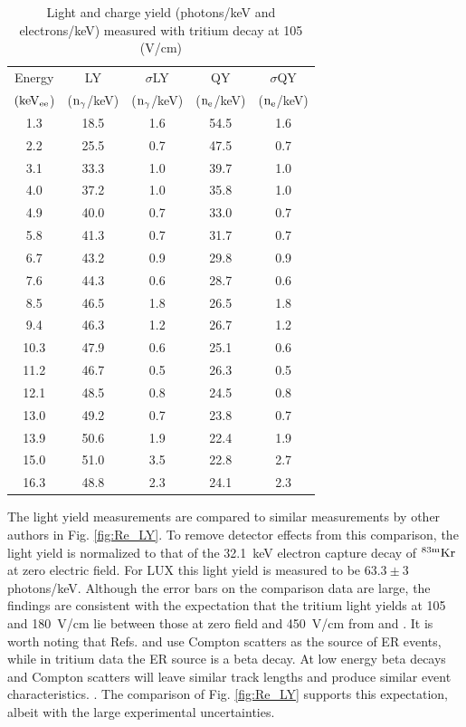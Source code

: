 \begin{table}[h!]
\centering
\begin{tabular}{|c|c|c|c|c|} \hline
Energy 	& 		LY	& 	$\sigma$LY & QY  & $\sigma$QY \\ 
$\rm (keV_{ee}$) & ($\rm n_\gamma$/keV) 	& ($\rm n_\gamma$/keV) & ($\rm n_e$/keV) & ($\rm n_e$/keV) \\ \hline
1.3 	 & 18.5 	 & 1.6 	 & 54.5 	 & 1.6 \\ \hline 
2.2 	 & 25.5 	 & 0.7 	 & 47.5 	 & 0.7 \\ \hline 
3.1 	 & 33.3 	 & 1.0 	 & 39.7 	 & 1.0 \\ \hline 
4.0 	 & 37.2 	 & 1.0 	 & 35.8 	 & 1.0 \\ \hline 
4.9 	 & 40.0 	 & 0.7 	 & 33.0 	 & 0.7 \\ \hline 
5.8 	 & 41.3 	 & 0.7 	 & 31.7 	 & 0.7 \\ \hline 
6.7 	 & 43.2 	 & 0.9 	 & 29.8 	 & 0.9 \\ \hline 
7.6 	 & 44.3 	 & 0.6 	 & 28.7 	 & 0.6 \\ \hline 
8.5 	 & 46.5 	 & 1.8 	 & 26.5 	 & 1.8 \\ \hline 
9.4 	 & 46.3 	 & 1.2 	 & 26.7 	 & 1.2 \\ \hline 
10.3 	 & 47.9 	 & 0.6 	 & 25.1 	 & 0.6 \\ \hline 
11.2 	 & 46.7 	 & 0.5 	 & 26.3 	 & 0.5 \\ \hline 
12.1 	 & 48.5 	 & 0.8 	 & 24.5 	 & 0.8 \\ \hline 
13.0 	 & 49.2 	 & 0.7 	 & 23.8 	 & 0.7 \\ \hline 
13.9 	 & 50.6 	 & 1.9 	 & 22.4 	 & 1.9 \\ \hline 
15.0 	 & 51.0 	 & 3.5 	 & 22.8 	 & 2.7 \\ \hline 
16.3 	 & 48.8 	 & 2.3 	 & 24.1 	 & 2.3 \\ \hline 
\end{tabular}
\caption{Light and charge yield (photons/keV and electrons/keV) measured with tritium decay at 105 (V/cm) }
\label{table:Yields_100}
\end{table}


The light yield measurements are compared to similar measurements by other authors in Fig. \ref{fig:Re_LY}. To remove detector effects from this comparison, the light yield is normalized to that of the 32.1~keV electron capture decay of $\rm ^{83m} Kr$ at zero electric field. For LUX this light yield is measured to be $ 63.3 \pm 3$ photons/keV. Although the error bars on the comparison data are large, the findings are consistent with the expectation that the tritium light yields at 105 and 180~V/cm lie between those at zero field and 450~V/cm from \cite{Aprile_LY} and \cite{Baudis}. It is worth noting that Refs. \cite{Aprile_LY} and \cite{Baudis} use Compton scatters as the source of ER events, while in tritium data the ER source is a beta decay. At low energy beta decays and Compton scatters will leave similar track lengths and produce similar event characteristics. . The comparison of Fig. \ref{fig:Re_LY} supports this expectation, albeit with the large experimental uncertainties.

